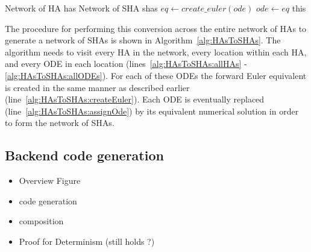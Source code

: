\renewcommand{\algorithmiccomment}[1]{// #1}
\renewcommand{\algorithmicrequire}{\textbf{Input:}}
\renewcommand{\algorithmicensure}{\textbf{Output:}}
\begin{algorithm}[t!]
	\begin{algorithmic}[1]
		\REQUIRE Network of HA has 
		\ENSURE Network of SHA shas
		 \label{alg:HAsToSHAs:allHAs}
			  \label{alg:HAsToSHAs:allLocs}
				 \label{alg:HAsToSHAs:allODEs}
					\STATE $eq \leftarrow create\_euler(ode)$ \label{alg:HAsToSHAs:createEuler}
					\STATE $ode \leftarrow eq$ \label{alg:HAsToSHAs:assignOde}
				\ENDFOR
			\ENDFOR
		\ENDFOR
		\RETURN this
	\end{algorithmic}
	\caption{The algorithm to generate a Network of \acp{SHA} from a Network of \acp{HA}}
	\label{alg:HAsToSHAs}
\end{algorithm}

The procedure for performing this conversion across the entire network of \acp{HA} to generate a network of \acp{SHA} is shown in Algorithm~\ref{alg:HAsToSHAs}.
The algorithm needs to visit every \ac{HA} in the network, every location within each \ac{HA}, and every \ac{ODE} in each location (lines~\ref{alg:HAsToSHAs:allHAs} - \ref{alg:HAsToSHAs:allODEs}).
For each of these \acp{ODE} the forward Euler equivalent is created in the same manner as described earlier (line~\ref{alg:HAsToSHAs:createEuler}).
Each \ac{ODE} is eventually replaced (line~\ref{alg:HAsToSHAs:assignOde}) by its equivalent numerical solution in order to form the network of \acp{SHA}.

\subsection{Backend code generation}
\label{sec:backendCodeGeneration}

\begin{itemize}
	\item Overview Figure
	\item code generation
	\item composition
	\item Proof for Determinism (still holds ?)
\end{itemize}